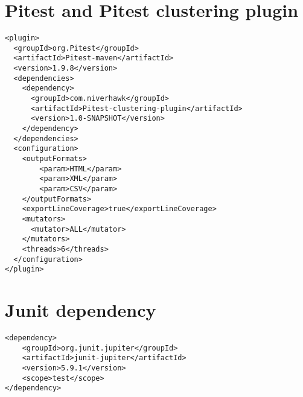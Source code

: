 \documentclass[twoside]{uva-inf-bachelor-thesis}
\begin{document}
\printbibliography

\appendix

\chapter{Pitest and Pitest clustering plugin}\label{Pitest and Pitest clustering plugin}
\begin{verbatim}
<plugin>
  <groupId>org.Pitest</groupId>
  <artifactId>Pitest-maven</artifactId>
  <version>1.9.8</version>
  <dependencies>
    <dependency>
      <groupId>com.niverhawk</groupId>
      <artifactId>Pitest-clustering-plugin</artifactId>
      <version>1.0-SNAPSHOT</version>
    </dependency>
  </dependencies>
  <configuration>
    <outputFormats>
        <param>HTML</param>
        <param>XML</param>
        <param>CSV</param>
    </outputFormats>
    <exportLineCoverage>true</exportLineCoverage>
    <mutators>
      <mutator>ALL</mutator>
    </mutators>
    <threads>6</threads>
  </configuration>
</plugin>
\end{verbatim}

\chapter{Junit dependency}\label{Junit dependency}
\begin{verbatim}
<dependency>
    <groupId>org.junit.jupiter</groupId>
    <artifactId>junit-jupiter</artifactId>
    <version>5.9.1</version>
    <scope>test</scope>
</dependency>
\end{verbatim}
\end{document}
